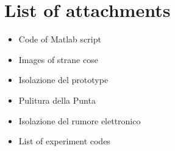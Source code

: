 \documentclass[11pt, a4paper]{article}
\begin{document}
\section{List of attachments}
\begin{itemize}
\item Code of Matlab script 
\item Images of strane cose
\item Isolazione del prototype
\item Pulitura della Punta 
\item Isolazione del rumore elettronico
\item List of experiment codes
\end{itemize}
%
\end{document}
